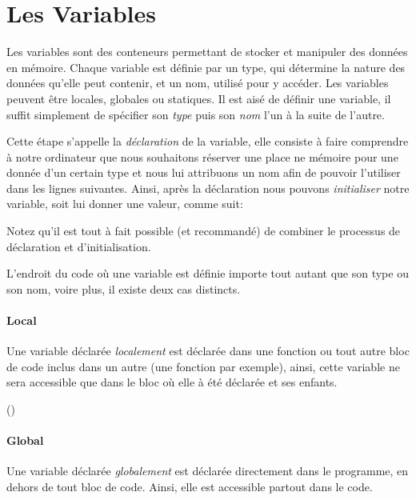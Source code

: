 \section{Les Variables}
Les variables sont des conteneurs permettant de stocker et manipuler des données en mémoire. Chaque variable est définie par un type, qui détermine la nature des données qu’elle peut contenir, et un nom, utilisé pour y accéder. Les variables peuvent être locales, globales ou statiques. Il est aisé de définir une variable, il suffit simplement de spécifier son \emph{type} puis son \emph{nom} l'un à la suite de l'autre.



Cette étape s'appelle la \emph{déclaration} de la variable, elle consiste à faire comprendre à notre ordinateur que nous souhaitons réserver une place ne mémoire pour une donnée d'un certain type et nous lui attribuons un nom afin de pouvoir l'utiliser dans les lignes suivantes. Ainsi, après la déclaration nous pouvons \emph{initialiser} notre variable, soit lui donner une valeur, comme suit:



Notez qu'il est tout à fait possible (et recommandé) de combiner le processus de déclaration et d'initialisation.



L'endroit du code où une variable est définie importe tout autant que son type ou son nom, voire plus, il existe deux cas distincts.

\paragraph{Local}
Une variable déclarée \emph{localement} est déclarée dans une fonction ou tout autre bloc de code inclus dans un autre (une fonction par exemple), ainsi, cette variable ne sera accessible que dans le bloc où elle à été déclarée et ses enfants.


()

\paragraph{Global}
Une variable déclarée \emph{globalement} est déclarée directement dans le programme, en dehors de tout bloc de code. Ainsi, elle est accessible partout dans le code.

